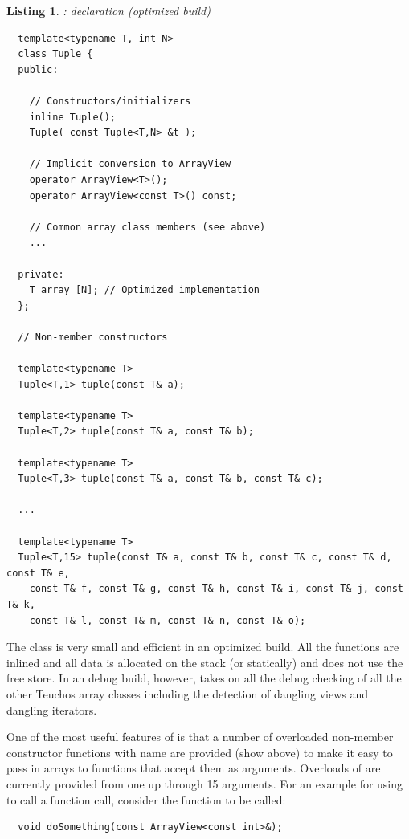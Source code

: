 \documentclass[pdf,ps2pdf,11pt]{SANDreport}
\newtheorem{listing}{Listing}
\begin{document}
\begin{listing}: {} declaration (optimized build) \\
\label{listing:Tuple}
{\small\begin{verbatim}
  template<typename T, int N>
  class Tuple {
  public:
    
    // Constructors/initializers
    inline Tuple();
    Tuple( const Tuple<T,N> &t );
  
    // Implicit conversion to ArrayView
    operator ArrayView<T>();
    operator ArrayView<const T>() const;
    
    // Common array class members (see above)
    ...
  
  private:
    T array_[N]; // Optimized implementation
  };
  
  // Non-member constructors
  
  template<typename T>
  Tuple<T,1> tuple(const T& a);
  
  template<typename T>
  Tuple<T,2> tuple(const T& a, const T& b);
  
  template<typename T>
  Tuple<T,3> tuple(const T& a, const T& b, const T& c);
  
  ...
  
  template<typename T>
  Tuple<T,15> tuple(const T& a, const T& b, const T& c, const T& d, const T& e,
    const T& f, const T& g, const T& h, const T& i, const T& j, const T& k,
    const T& l, const T& m, const T& n, const T& o);
\end{verbatim}}
\end{listing}

The class {} is very small and efficient in an optimized
build.  All the functions are inlined and all data is allocated on the
stack (or statically) and does not use the free store.  In an debug
build, however, {} takes on all the debug checking of all
the other Teuchos array classes including the detection of dangling
{} views and dangling iterators.

One of the most useful features of {} is that a number of
overloaded non-member constructor functions with name
{} are provided (show above) to make it easy to pass
in arrays to functions that accept them as {}
arguments.  Overloads of {} are currently provided
from one up through 15 arguments.  For an example for using
{} to call a function call, consider the function to
be called:

{\small\begin{verbatim}
  void doSomething(const ArrayView<const int>&);
\end{verbatim}}
\end{document}
